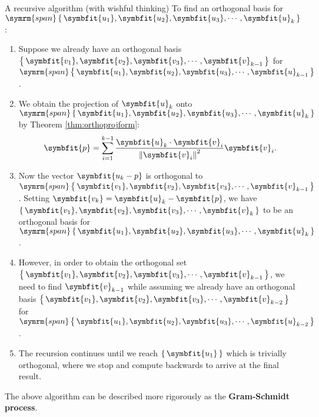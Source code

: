 \documentclass[math]{amznotes}
\theoremstyle{remark}
\begin{document}
\begin{genbox}{A recursive algorithm (with wishful thinking)}{}
    To find an orthogonal basis for $\symrm{span}\left\{\, \symbfit{u_1}, \symbfit{u_2}, \symbfit{u_3}, \cdots, \symbfit{u}_k \,\right\}$:
    \begin{enumerate}
        \item Suppose we already have an orthogonal basis $\left\{\, \symbfit{v_1}, \symbfit{v_2}, \symbfit{v_3}, \cdots, \symbfit{v}_{k - 1} \,\right\}$ for $\symrm{span}\left\{\, \symbfit{u_1}, \symbfit{u_2}, \symbfit{u_3}, \cdots, \symbfit{u}_{k - 1} \,\right\}$.
        \item We obtain the projection of $\symbfit{u}_k$ onto $\symrm{span}\left\{\, \symbfit{u_1}, \symbfit{u_2}, \symbfit{u_3}, \cdots, \symbfit{u}_k \,\right\}$ by Theorem \ref{thm:orthoprojform}:
              \begin{displaymath}
                  \symbfit{p} = \sum_{i = 1}^{k - 1} \frac{\symbfit{u}_k \cdot \symbfit{v}_i}{\left\lVert \symbfit{v}_i \right\rVert^2}\symbfit{v}_i.
              \end{displaymath}
        \item Now the vector $\symbfit{u_k - p}$ is orthogonal to $\symrm{span}\left\{\, \symbfit{v_1}, \symbfit{v_2}, \symbfit{v_3}, \cdots, \symbfit{v}_{k - 1} \,\right\}$. Setting $\symbfit{v_k} = \symbfit{u}_k - \symbfit{p}$, we have $\left\{\, \symbfit{v_1}, \symbfit{v_2}, \symbfit{v_3}, \cdots, \symbfit{v}_k \,\right\}$ to be an orthogonal basis for $\symrm{span}\left\{\, \symbfit{u_1}, \symbfit{u_2}, \symbfit{u_3}, \cdots, \symbfit{u}_k \,\right\}$.
        \item However, in order to obtain the orthogonal set $\left\{\, \symbfit{v_1}, \symbfit{v_2}, \symbfit{v_3}, \cdots, \symbfit{v}_{k - 1} \,\right\}$, we need to find $\symbfit{v}_{k - 1}$ while assuming we already have an orthogonal basis $\left\{\, \symbfit{v_1}, \symbfit{v_2}, \symbfit{v_3}, \cdots, \symbfit{v}_{k - 2} \,\right\}$ for $\symrm{span}\left\{\, \symbfit{u_1}, \symbfit{u_2}, \symbfit{u_3}, \cdots, \symbfit{u}_{k - 2} \,\right\}$.
        \item The recursion continues until we reach $\left\{\, \symbfit{u_1} \,\right\}$ which is trivially orthogonal, where we stop and compute backwards to arrive at the final result.
    \end{enumerate}
\end{genbox}
The above algorithm can be described more rigorously as the {\color{red} \textbf{Gram-Schmidt process}}.
\end{document}
